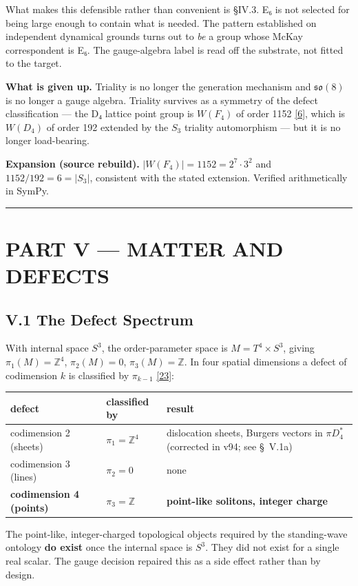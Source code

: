 \documentclass[a4paper,11pt]{article}
\newcommand{\expansion}[1]{\par\smallskip\noindent\textbf{Expansion (source rebuild).} #1\par\smallskip}
\begin{document}
What makes this defensible rather than convenient is §IV.3. E₆ is not selected for being large enough to contain what is needed. The pattern established on independent dynamical grounds turns out to \textit{be} a group whose McKay correspondent is E₆. The gauge-algebra label is read off the substrate, not fitted to the target.

\textbf{What is given up.} Triality is no longer the generation mechanism and $\mathfrak{so}(8)$ is no longer a gauge algebra. Triality survives as a symmetry of the defect classification — the D₄ lattice point group is $W(F_4)$ of order 1152 \hyperref[ref6]{[6]}, which is $W(D_4)$ of order 192 extended by the $S_3$ triality automorphism — but it is no longer load-bearing.


\expansion{$|W(F_4)| = 1152 = 2^7\cdot 3^2$ and $1152/192 = 6 = |S_3|$, consistent with the stated extension. Verified arithmetically in SymPy.}
\medskip\hrule\medskip

\section*{PART V — MATTER AND DEFECTS}

\subsection*{V.1 The Defect Spectrum}

With internal space $S^3$, the order-parameter space is $M=T^4\times S^3$, giving $\pi_1(M)=\mathbb{Z}^4$, $\pi_2(M)=0$, $\pi_3(M)=\mathbb{Z}$. In four spatial dimensions a defect of codimension $k$ is classified by $\pi_{k-1}$ \hyperref[ref23]{[23]}:

\begin{center}
\begin{tabularx}{\linewidth}{ll>{\raggedright\arraybackslash}X}
\hline
defect & classified by & result \\
\hline
codimension 2 (sheets) & $\pi_1=\mathbb{Z}^4$ & dislocation sheets, Burgers vectors in $\pi D_4^*$ (corrected in v94; see \S~V.1a) \\
codimension 3 (lines) & $\pi_2=0$ & none \\
\textbf{codimension 4 (points)} & $\pi_3=\mathbb{Z}$ & \textbf{point-like solitons, integer charge} \\
\hline
\end{tabularx}
\end{center}

The point-like, integer-charged topological objects required by the standing-wave ontology \textbf{do exist} once the internal space is $S^3$. They did not exist for a single real scalar. The gauge decision repaired this as a side effect rather than by design.
\end{document}
